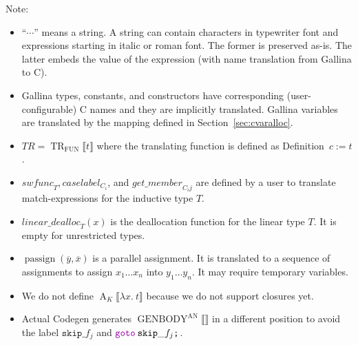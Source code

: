 \documentclass[a4paper,fleqn]{article}
\def\gallina{\textrm{Gallina}}
\def\codegen{\textrm{Codegen}}
\newcommand{\kwDefinition}{\mbox{\color{myviolet}\ttfamily Definition}}
\newcommand{\kwmatch}{\mbox{\color{mygreen}\ttfamily match}}
\newcommand{\lam}[2]{\lambda #1.\:#2}
\newcommand{\BRA}[1]{\llbracket #1 \rrbracket}
\DeclareMathOperator{\genbody}{GENBODY}
\newcommand{\genbodyan}[1]{\genbody^\mathrm{AN}\BRA{#1}}
\DeclareMathOperator{\TRop}{TR}
\newcommand{\TRFUN}[1]{\TRop_\text{FUN}\BRA{#1}}
\newcommand{\tr}{\mathit{TR}}
\newcommand{\dq}[1]{\text{``}#1\text{''}}
\newcommand{\ttsemi}{\texttt{;}}
\newcommand{\kwgoto}{\mbox{\color{myviolet}\ttfamily goto}}
\newcommand{\secref}[1]{Section~\ref{#1}}
\DeclareMathOperator{\passign}{passign}
\DeclareMathOperator{\Aop}{A}
\newcommand{\A}[2]{\Aop_{#1}\BRA{#2}}
\newcommand{\rep}[1]{\overline{#1}}
\begin{document}
{\small Note:
\begin{itemize}
  \item $\dq{\cdots}$ means a string.
    A string can contain characters in typewriter font and expressions starting in italic or roman font.
    The former is preserved as-is.
    The latter embeds the value of the expression (with name translation from \gallina{} to C).
  \item \gallina{} types, constants, and constructors have corresponding (user-configurable) C names and they are implicitly translated.
    \gallina{} variables are translated by the mapping defined in \secref{sec:cvaralloc}.
  \item $\tr = \TRFUN{t}$ where the translating function is defined as \kwDefinition~$c := t$.
  \item $\mathit{swfunc}_T, \mathit{caselabel}_{C_i}$, and $\mathit{get\_member}_{C_i j}$ are defined by a user to translate \kwmatch-expressions for the inductive type $T$.
  \item $\mathit{linear\_dealloc}_{T}(x)$ is the deallocation function for the linear type $T$.  It is empty for unrestricted types.
  \item $\passign(\rep{y}, \rep{x})$ is a parallel assignment. It is translated to a sequence of assignments to assign $x_1\ldots x_n$ into $y_1\ldots y_n$.  It may require temporary variables.
  \item We do not define $\A{K}{\lam{x}{t}}$ because we do not support closures yet.
  \item Actual \codegen{} generates $\genbodyan{}$ in a different position to avoid the label $\mathtt{skip\_}f_j$ and $\kwgoto\:\mathtt{skip\_}f_j\ttsemi$.
\end{itemize}}
\end{document}
